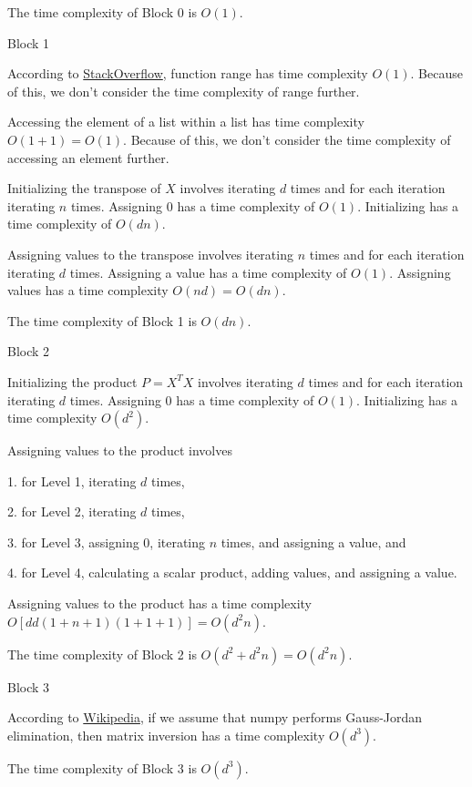 \documentclass{article}
\begin{document}
The time complexity of Block 0 is $O(1)$.

Block 1

According to \href{https://stackoverflow.com/questions/57929556/python-in-operator-time-complexity-on-range}{StackOverflow}, function range has time complexity $O(1)$. Because of this, we don't consider the time complexity of range further.

Accessing the element of a list within a list has time complexity $O(1 + 1) = O(1)$. Because of this, we don't consider the time complexity of accessing an element further.

Initializing the transpose of $X$ involves iterating $d$ times and for each iteration iterating $n$ times. Assigning $0$ has a time complexity of $O(1)$. Initializing has a time complexity of $O(dn)$.

Assigning values to the transpose involves iterating $n$ times and for each iteration iterating $d$ times. Assigning a value has a time complexity of $O(1)$. Assigning values has a time complexity $O(nd) = O(dn)$.

The time complexity of Block 1 is $O(dn)$.

Block 2

Initializing the product $P = X^T X$ involves iterating $d$ times and for each iteration iterating $d$ times. Assigning $0$ has a time complexity of $O(1)$. Initializing has a time complexity $O\left(d^2\right)$.

Assigning values to the product involves

1. for Level 1, iterating $d$ times,

2. for Level 2, iterating $d$ times,

3. for Level 3, assigning $0$, iterating $n$ times, and assigning a value, and

4. for Level 4, calculating a scalar product, adding values, and assigning a value.

Assigning values to the product has a time complexity $O[dd(1+n+1)(1+1+1)] = O\left(d^2 n\right)$.

The time complexity of Block 2 is $O\left(d^2 + d^2 n\right) = O\left(d^2 n\right)$.

Block 3

According to \href{https://en.wikipedia.org/wiki/Computational\_complexity\_of\_mathematical\_operations}{Wikipedia}, if we assume that numpy performs Gauss-Jordan elimination, then matrix inversion has a time complexity $O\left(d^3\right)$.

The time complexity of Block 3 is $O\left(d^3\right)$.
\end{document}
